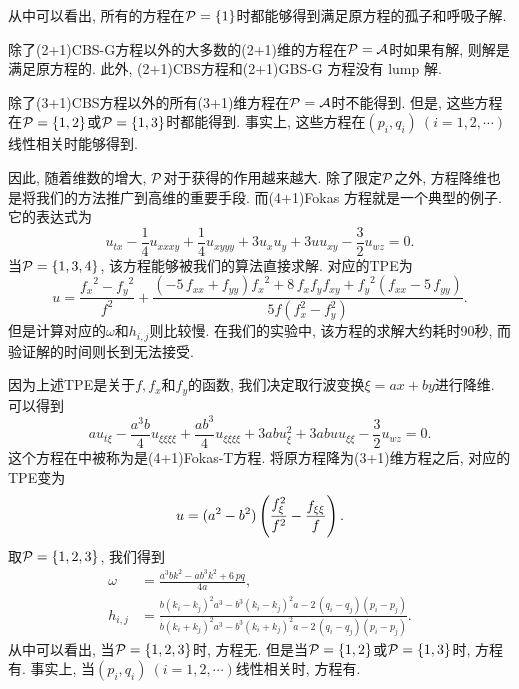 从中可以看出, 所有的方程在$\mathcal{P}=\{1\}$时都能够得到满足原方程的孤子和呼吸子解. 

除了(2+1)CBS-G方程以外的大多数的(2+1)维的方程在$\mathcal{P}= \mathcal{A}$时如果有解, 则解是满足原方程的. 此外, (2+1)CBS方程和(2+1)GBS-G 方程没有 lump 解. 

除了(3+1)CBS方程以外的所有(3+1)维方程在$\mathcal{P}= \mathcal{A}$时不能得到\TrueSol{}. 但是, 这些方程在$\mathcal{P}=\{1,2\}$或$\mathcal{P}=\{1,3\}$时都能得到\TrueSol{}. 事实上, 这些方程在$(p_i,q_i)~(i=1,2,\cdots)$线性相关时能够得到\TrueSol{}.

因此, 随着维数的增大, $\mathcal{P}$对于获得\TrueSol{}的作用越来越大. 除了限定$\mathcal{P}$之外, 方程降维也是将我们的方法推广到高维的重要手段. 而(4+1)Fokas 方程\CITEdaFokas{}就是一个典型的例子. 它的表达式为
\begin{equation}
    u_{tx}-\frac{1}{4}u_{xxxy}+\frac{1}{4}u_{xyyy}+3u_xu_y+3uu_{xy}-\frac{3}{2}u_{wz}=0. \label{Fokas}
\end{equation}
当$\mathcal{P}=\{1,3,4\}$, 该方程能够被我们的算法直接求解. 对应的TPE为
\begin{equation}
u={\frac {{f_{{x}}}^{2}-{f_{{y}}}^{2}}{{f}^{2}}}+{\frac { \left( -5\,f_{
{{ xx}}}+f_{{{ yy}}} \right) {f_{{x}}}^{2}+8\,f_{{x}}f_{{y}}f_{{
{ xy}}}+{f_{{y}}}^{2} \left( f_{{{ xx}}}-5\,f_{{{ yy}}}
\right) }{5f(f_x^2-f_y^2)}}.
\end{equation}
但是计算对应的$\omega$和$h_{i,j}$则比较慢. 在我们的实验中, 该方程的求解大约耗时90秒, 而验证解的时间则长到无法接受. 

因为上述TPE是关于$f,f_x$和$f_y$的函数, 我们决定取行波变换$\xi=ax+by$进行降维. 可以得到
\begin{equation}
    au_{t\xi}-\frac{a^3b}{4}u_{\xi\xi\xi\xi}+\frac{ab^3}{4}u_{\xi\xi\xi\xi}+3abu_{\xi}^2+3abuu_{\xi\xi}-\frac{3}{2}u_{wz}=0.  \label{Fokas-T}
\end{equation}
这个方程在中被称为是(4+1)Fokas-T方程. 将原方程降为(3+1)维方程之后, 对应的TPE变为
\begin{equation}
    u=(a^2-b^2)\left(\frac{f_{\xi}^2}{f^2}-\frac{f_{\xi\xi}}{f}\right).
\end{equation}
取$\mathcal{P}=\{1,2,3\}$, 我们得到
\begin{equation}
\begin{split}
    \omega&={\frac {{a}^{3}b{k}^{2}-a{b}^{3}{k}^{2}+6\,pq}{4a}}, \\
    h_{{i,j}}&={\frac {b \left( k_{{i}}-k_{{j}} \right) ^{2}{a}^{3}-{b}^{3}
    \left( k_{{i}}-k_{{j}} \right) ^{2}a-2\, \left( q_{{i}}-q_{{j}}
    \right)  \left( p_{{i}}-p_{{j}} \right) }{b \left( k_{{i}}+k_{{j}}
    \right) ^{2}{a}^{3}-{b}^{3} \left( k_{{i}}+k_{{j}} \right) ^{2}a-2\,
    \left( q_{{i}}-q_{{j}} \right)  \left( p_{{i}}-p_{{j}} \right) }}.
\end{split}
\end{equation}
从中可以看出, 当$\mathcal{P}=\{1,2,3\}$时, 方程无\TrueSol{}. 但是当$\mathcal{P}=\{1,2\}$或$\mathcal{P}=\{1,3\}$时, 方程有\TrueSol{}. 事实上, 当$(p_i,q_i)~(i=1,2,\cdots)$线性相关时, 方程有\TrueSol{}.

